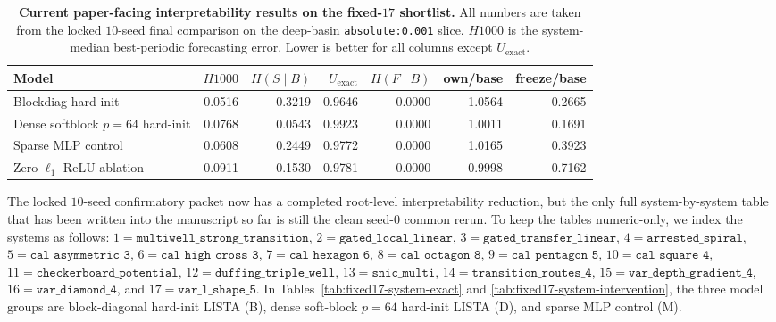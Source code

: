 \begin{table}[ht]
\centering
\small
\setlength{\tabcolsep}{5pt}
\begin{tabular}{lrrrrrr}
\toprule
Model & $H1000$ & $H(S \mid B)$ & $U_{\mathrm{exact}}$ & $H(F \mid B)$ & own/base & freeze/base \\
\midrule
Blockdiag hard-init & 0.0516 & 0.3219 & 0.9646 & 0.0000 & 1.0564 & 0.2665 \\
Dense softblock $p{=}64$ hard-init & 0.0768 & 0.0543 & 0.9923 & 0.0000 & 1.0011 & 0.1691 \\
Sparse MLP control & 0.0608 & 0.2449 & 0.9772 & 0.0000 & 1.0165 & 0.3923 \\
Zero-$\ell_1$ ReLU ablation & 0.0911 & 0.1530 & 0.9781 & 0.0000 & 0.9998 & 0.7162 \\
\bottomrule
\end{tabular}
\caption{\textbf{Current paper-facing interpretability results on the fixed-$17$ shortlist.} All numbers are taken from the locked $10$-seed final comparison on the deep-basin \texttt{absolute:0.001} slice. $H1000$ is the system-median best-periodic forecasting error. Lower is better for all columns except $U_{\mathrm{exact}}$.}
\label{tab:fixed17-interpretability-results}
\end{table}

The locked $10$-seed confirmatory packet now has a completed root-level
interpretability reduction, but the only full system-by-system table that has
been written into the manuscript so far is still the clean seed-$0$ common
rerun. To keep the tables numeric-only, we index the systems
as follows:
$1=\texttt{multiwell\_strong\_transition}$,
$2=\texttt{gated\_local\_linear}$,
$3=\texttt{gated\_transfer\_linear}$,
$4=\texttt{arrested\_spiral}$,
$5=\texttt{cal\_asymmetric\_3}$,
$6=\texttt{cal\_high\_cross\_3}$,
$7=\texttt{cal\_hexagon\_6}$,
$8=\texttt{cal\_octagon\_8}$,
$9=\texttt{cal\_pentagon\_5}$,
$10=\texttt{cal\_square\_4}$,
$11=\texttt{checkerboard\_potential}$,
$12=\texttt{duffing\_triple\_well}$,
$13=\texttt{snic\_multi}$,
$14=\texttt{transition\_routes\_4}$,
$15=\texttt{var\_depth\_gradient\_4}$,
$16=\texttt{var\_diamond\_4}$,
and $17=\texttt{var\_l\_shape\_5}$.
In Tables~\ref{tab:fixed17-system-exact} and
\ref{tab:fixed17-system-intervention}, the three model groups are
block-diagonal hard-init LISTA (B), dense soft-block $p=64$ hard-init LISTA
(D), and sparse MLP control (M).

